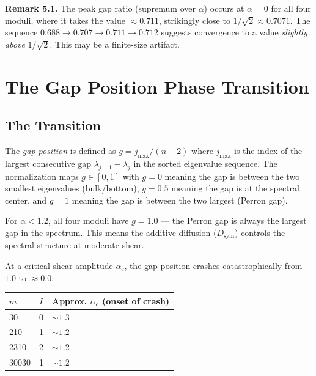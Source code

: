 \documentclass[11pt,letterpaper]{article}
\theoremstyle{definition}
\theoremstyle{remark}
\begin{document}
\textbf{Remark 5.1.} The peak gap ratio (supremum over $\alpha$) occurs at $\alpha = 0$ for all four moduli, where it takes the value $\approx 0.711$, strikingly close to $1/\sqrt{2} \approx 0.7071$. The sequence $0.688 \to 0.707 \to 0.711 \to 0.712$ suggests convergence to a value \emph{slightly above} $1/\sqrt{2}$. This may be a finite-size artifact.

\section{The Gap Position Phase Transition}\label{the-gap-position-phase-transition}

\subsection{The Transition}\label{the-transition}

The \emph{gap position} is defined as $g = j_{\max} / (n - 2)$ where $j_{\max}$ is the index of the largest consecutive gap $\lambda_{j+1} - \lambda_j$ in the sorted eigenvalue sequence. The normalization maps $g \in [0, 1]$ with $g = 0$ meaning the gap is between the two smallest eigenvalues (bulk/bottom), $g = 0.5$ meaning the gap is at the spectral center, and $g = 1$ meaning the gap is between the two largest (Perron gap).

For $\alpha < 1.2$, all four moduli have $g = 1.0$ --- the Perron gap is always the largest gap in the spectrum. This means the additive diffusion ($D_{\text{sym}}$) controls the spectral structure at moderate shear.

At a critical shear amplitude $\alpha_c$, the gap position crashes catastrophically from $1.0$ to $\approx 0.0$:

\begin{longtable}[]{@{}lll@{}}
\toprule
$m$ & $I$ & Approx. $\alpha_c$ (onset of crash) \\
\midrule
\endhead
\bottomrule
30 & 0 & $\sim 1.3$ \\
210 & 1 & $\sim 1.2$ \\
2310 & 2 & $\sim 1.2$ \\
30030 & 1 & $\sim 1.2$ \\
\end{longtable}
\end{document}
